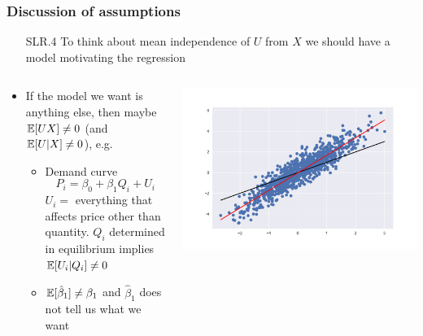 \begin{frame}[allowframebreaks]
  \frametitle{Discussion of assumptions}
  \begin{itemize}
  \item[SLR.4] To think about mean independence of $U$ from $X$
    we should have a model motivating the regression
  \end{itemize}
  \begin{columns}[c] %
    \begin{column}{.48\textwidth}
      \begin{itemize}
      \item If the model we want is anything else, then maybe
        $\mathbb{E}[UX] \neq 0$ (and $\mathbb{E}[U | X] \neq 0$), e.g.\ 
        \begin{itemize}
        \item Demand curve 
          \[ P_i = \beta_0 + \beta_1 Q_i + U_i \]
          $U_i = $ everything that affects price other than
          quantity. $Q_i$ determined in equilibrium implies
          $\mathbb{E}[U_i | Q_i] \neq 0$ 
        \item $\mathbb{E}[\hat{\beta}_1] \neq \beta_1$ and $\hat{\beta}_1$ does
          not tell us what we want
        \end{itemize}
      \end{itemize}
    \end{column}
    \begin{column}{.48\textwidth}
      \includegraphics[width=\textwidth]{endogenousX} \\
    \end{column}
  \end{columns}


\end{frame}
